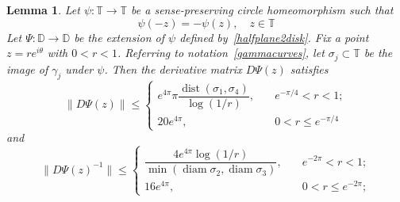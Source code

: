 \documentclass[11pt]{amsart}
\newtheorem{lemma}[theorem]{Lemma}
\theoremstyle{remark}
\numberwithin{equation}{section}
\newcommand{\DD}{\mathbb{D}}
\newcommand{\T}{\mathbb{T}}
\newcommand{\norm}[1]{\lVert#1\rVert}
\DeclareMathOperator{\dist}{dist}
\DeclareMathOperator{\diam}{diam}
\begin{document}
 \begin{lemma}\label{homeodist} Let $\psi\colon \T\to\T$ be a sense-preserving circle homeomorphism such that 
\begin{equation}\label{symm1}
\psi(-z) = -\psi(z),\quad z\in\T
\end{equation}
Let $\Psi\colon \DD\to\DD$ be the extension of $\psi$ defined by~\eqref{halfplane2disk}. Fix a point $z = re^{i\theta}$ with $0<r<1$. Referring to notation~\eqref{gammacurves}, let $\sigma_j\subset\T$ be the image of $\gamma_j$ under $\psi$.  Then the derivative matrix $D\Psi(z)$ satisfies
\begin{equation}\label{BAderest1}
\norm{D\Psi(z)} \le  
\begin{cases}
e^{4\pi} \pi \dfrac{\dist(\sigma_1, \sigma_4)}{\log(1/r)},\quad 
&e^{-\pi/4} < r< 1; \\ 
20 e^{4\pi} ,\quad &0<r \le e^{-\pi/4}
\end{cases}
\end{equation}
and
\begin{equation}\label{BAderest2}
\norm{D\Psi(z)^{-1}} \le 
\begin{cases}
\dfrac{4e^{4\pi} \log(1/r)}{\min(\diam \sigma_2, \diam \sigma_3)},\quad &e^{-2\pi} < r< 1; \\ 
16 e^{4\pi} ,\quad &0<r \le e^{-2\pi};
\end{cases}
\end{equation}
\end{lemma} 
\end{document}
